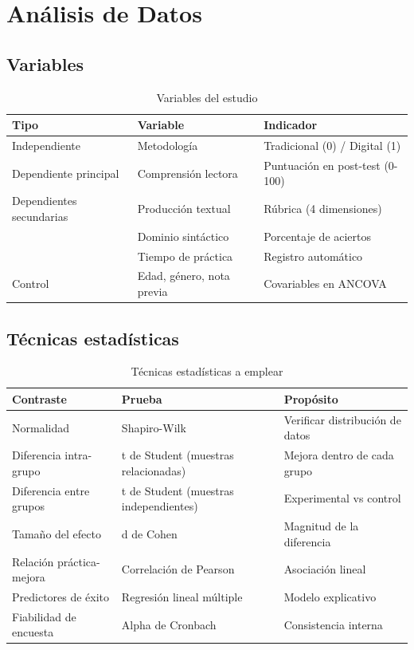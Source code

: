 \documentclass[12pt,spanish]{article}
\begin{document}
\newpage
\section{Análisis de Datos}

\subsection{Variables}

\begin{table}[H]
\centering
\caption{Variables del estudio}
\label{tab:variables}
\begin{tabular}{|p{3cm}|p{4cm}|p{6cm}|}
\hline
\textbf{Tipo} & \textbf{Variable} & \textbf{Indicador} \\
\hline
Independiente & Metodología & Tradicional (0) / Digital (1) \\
\hline
Dependiente principal & Comprensión lectora & Puntuación en post-test (0-100) \\
\hline
Dependientes secundarias & Producción textual & Rúbrica (4 dimensiones) \\
\hline
 & Dominio sintáctico & Porcentaje de aciertos \\
\hline
 & Tiempo de práctica & Registro automático \\
\hline
Control & Edad, género, nota previa & Covariables en ANCOVA \\
\hline
\end{tabular}
\end{table}

\subsection{Técnicas estadísticas}

\begin{table}[H]
\centering
\caption{Técnicas estadísticas a emplear}
\label{tab:estadisticas}
\begin{tabular}{|p{4cm}|p{4cm}|p{5cm}|}
\hline
\textbf{Contraste} & \textbf{Prueba} & \textbf{Propósito} \\
\hline
Normalidad & Shapiro-Wilk & Verificar distribución de datos \\
\hline
Diferencia intra-grupo & t de Student (muestras relacionadas) & Mejora dentro de cada grupo \\
\hline
Diferencia entre grupos & t de Student (muestras independientes) & Experimental vs control \\
\hline
Tamaño del efecto & d de Cohen & Magnitud de la diferencia \\
\hline
Relación práctica-mejora & Correlación de Pearson & Asociación lineal \\
\hline
Predictores de éxito & Regresión lineal múltiple & Modelo explicativo \\
\hline
Fiabilidad de encuesta & Alpha de Cronbach & Consistencia interna \\
\hline
\end{tabular}
\end{table}
\end{document}
